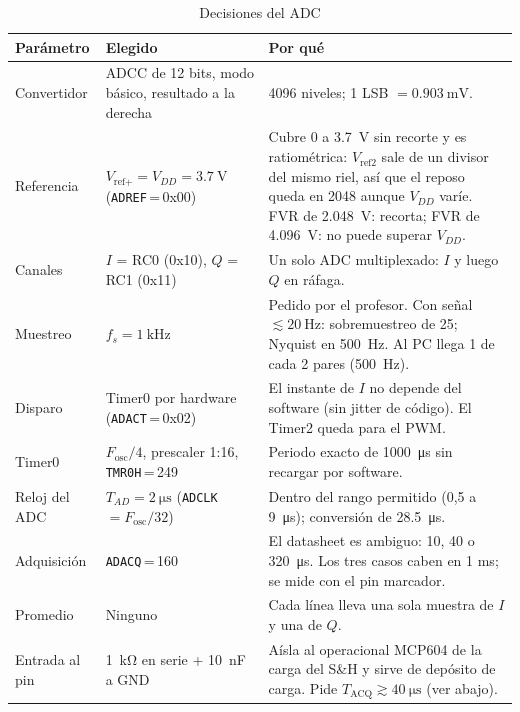 \documentclass[11pt,letterpaper]{article}
\begin{document}
\begin{table}[!htb]
\caption{Decisiones del ADC}\label{tab:adc}
\centering
\begin{tabularx}{\textwidth}{@{}l>{\raggedright\arraybackslash}p{}Y@{}}
\toprule
\textbf{Parámetro} & \textbf{Elegido} & \textbf{Por qué} \\
\midrule
Convertidor & ADCC de 12 bits, modo básico, resultado a la derecha & 4096 niveles; 1 LSB $= \SI{0.903}{\milli\volt}$. \\
Referencia & $V_\text{ref+} = V_{DD} = \SI{3.7}{\volt}$ (\texttt{ADREF}\,=\,0x00) & Cubre 0 a \SI{3.7}{\volt} sin recorte y es ratiométrica: $V_\text{ref2}$ sale de un divisor del mismo riel, así que el reposo queda en 2048 aunque $V_{DD}$ varíe. FVR de \SI{2.048}{\volt}: recorta; FVR de \SI{4.096}{\volt}: no puede superar $V_{DD}$. \\
Canales & $I$ = RC0 (0x10), $Q$ = RC1 (0x11) & Un solo ADC multiplexado: $I$ y luego $Q$ en ráfaga. \\
Muestreo & $f_s = \SI{1}{\kilo\hertz}$ & Pedido por el profesor. Con señal $\lesssim \SI{20}{\hertz}$: sobremuestreo de 25; Nyquist en \SI{500}{\hertz}. Al PC llega 1 de cada 2 pares (\SI{500}{\hertz}). \\
Disparo & Timer0 por hardware (\texttt{ADACT}\,=\,0x02) & El instante de $I$ no depende del software (sin jitter de código). El Timer2 queda para el PWM. \\
Timer0 & $F_\text{osc}/4$, prescaler 1:16, \texttt{TMR0H}\,=\,249 & Periodo exacto de \SI{1000}{\micro\second} sin recargar por software. \\
Reloj del ADC & $T_{AD} = \SI{2}{\micro\second}$ (\texttt{ADCLK} $= F_\text{osc}/32$) & Dentro del rango permitido (0,5 a \SI{9}{\micro\second}); conversión de \SI{28.5}{\micro\second}. \\
Adquisición & \texttt{ADACQ}\,=\,160 & El datasheet es ambiguo: 10, 40 o \SI{320}{\micro\second}. Los tres casos caben en 1 ms; se mide con el pin marcador. \\
Promedio & Ninguno & Cada línea lleva una sola muestra de $I$ y una de $Q$. \\
Entrada al pin & \SI{1}{\kilo\ohm} en serie + \SI{10}{\nano\farad} a GND & Aísla al operacional MCP604 de la carga del S\&H y sirve de depósito de carga. Pide $T_\text{ACQ} \gtrsim \SI{40}{\micro\second}$ (ver abajo). \\
\bottomrule
\end{tabularx}
\end{table}
\end{document}
